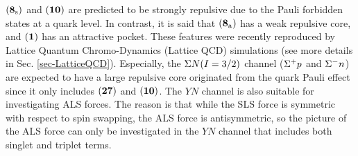 ${\bf (8_{\rm{s}})}$ and ${\bf (10)}$ are predicted to be strongly repulsive due to the Pauli forbidden states at a quark level. In contrast, it is said that ${\bf (8_{\rm{a}})}$ has a weak repulsive core, and ${\bf (1)}$ has an attractive pocket. These features were recently reproduced by Lattice Quantum Chromo-Dynamics (Lattice QCD) simulations \cite{QCD-2019} (see more details in Sec. \ref{sec-LatticeQCD}). Especially, the $\Sigma N(I=3/2)$ channel ($\Sigma^{+}p$ and $\Sigma^{-}n$) are expected to have a large repulsive core originated from the quark Pauli effect since it only includes ${\bf (27)}$ and ${\bf (10)}$. The $YN$ channel is also suitable for investigating ALS forces. The reason is that while the SLS force is symmetric with respect to spin swapping, the ALS force is antisymmetric, so the picture of the ALS force can only be investigated in the $YN$ channel that includes both singlet and triplet terms. 


